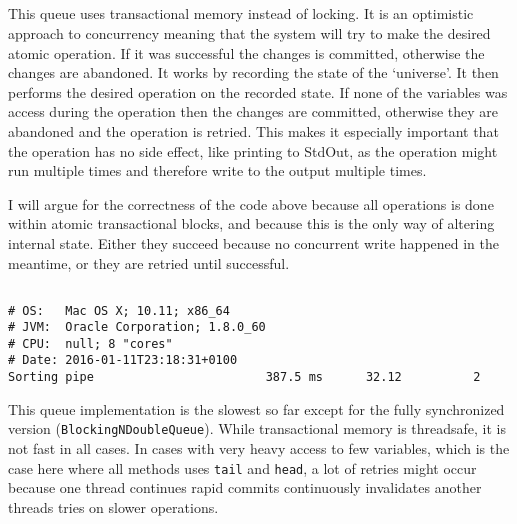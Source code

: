\documentclass{ituhandin}
\begin{document}
\section{}
This queue uses transactional memory instead of locking. It is an optimistic approach to concurrency meaning that the system will try to make the desired atomic operation. If it was successful the changes is committed, otherwise the changes are abandoned. It works by recording the state of the `universe'. It then performs the desired operation on the recorded state. If none of the variables was access during the operation then the changes are committed, otherwise they are abandoned and the operation is retried. This makes it especially important that the operation has no side effect, like printing to StdOut, as the operation might run multiple times and therefore write to the output multiple times.

I will argue for the correctness of the code above because all operations is done within atomic transactional blocks, and because this is the only way of altering internal state. Either they succeed because no concurrent write happened in the meantime, or they are retried until successful.

\section{}
\begin{lstlisting}[language={},frame={}]
# OS:   Mac OS X; 10.11; x86_64
# JVM:  Oracle Corporation; 1.8.0_60
# CPU:  null; 8 "cores"
# Date: 2016-01-11T23:18:31+0100
Sorting pipe                        387.5 ms      32.12          2
\end{lstlisting}

This queue implementation is the slowest so far except for the fully synchronized version (\texttt{BlockingNDoubleQueue}). While transactional memory is threadsafe, it is not fast in all cases. In cases with very heavy access to few variables, which is the case here where all methods uses \texttt{tail} and \texttt{head}, a lot of retries might occur because one thread continues rapid commits continuously invalidates another threads tries on slower operations.


\chapter{} %
\section{}
\end{document}
